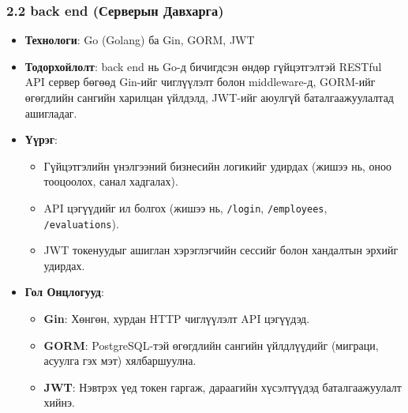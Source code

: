 \subsubsection*{2.2 back end (Серверын Давхарга)}
\begin{itemize}
    \item \textbf{Технологи}: Go (Golang) ба Gin, GORM, JWT
    \item \textbf{Тодорхойлолт}: back end нь Go-д бичигдсэн өндөр гүйцэтгэлтэй RESTful API сервер бөгөөд Gin-ийг чиглүүлэлт болон middleware-д, GORM-ийг өгөгдлийн сангийн харилцан үйлдэлд, JWT-ийг аюулгүй баталгаажуулалтад ашигладаг.
    \item \textbf{Үүрэг}:
    \begin{itemize}
        \item Гүйцэтгэлийн үнэлгээний бизнесийн логикийг удирдах (жишээ нь, оноо тооцоолох, санал хадгалах).
        \item API цэгүүдийг ил болгох (жишээ нь, \texttt{/login}, \texttt{/employees}, \texttt{/evaluations}).
        \item JWT токенуудыг ашиглан хэрэглэгчийн сессийг болон хандалтын эрхийг удирдах.
    \end{itemize}
    \item \textbf{Гол Онцлогууд}:
    \begin{itemize}
        \item \textbf{Gin}: Хөнгөн, хурдан HTTP чиглүүлэлт API цэгүүдэд.
        \item \textbf{GORM}: PostgreSQL-тэй өгөгдлийн сангийн үйлдлүүдийг (миграци, асуулга гэх мэт) хялбаршуулна.
        \item \textbf{JWT}: Нэвтрэх үед токен гаргаж, дараагийн хүсэлтүүдэд баталгаажуулалт хийнэ.
    \end{itemize}
\end{itemize}

